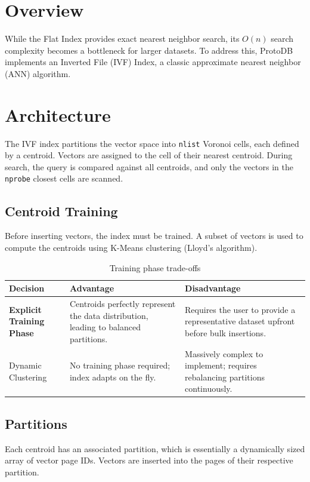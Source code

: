 \documentclass[12pt, a4paper]{report}
\begin{document}
\section{Overview}
While the Flat Index provides exact nearest neighbor search, its $O(n)$ search complexity becomes a bottleneck for larger datasets. To address this, ProtoDB implements an Inverted File (IVF) Index, a classic approximate nearest neighbor (ANN) algorithm.

\section{Architecture}
The IVF index partitions the vector space into \texttt{nlist} Voronoi cells, each defined by a centroid. 
Vectors are assigned to the cell of their nearest centroid. During search, the query is compared against all centroids, and only the vectors in the \texttt{nprobe} closest cells are scanned.

\subsection{Centroid Training}
Before inserting vectors, the index must be trained. A subset of vectors is used to compute the centroids using K-Means clustering (Lloyd's algorithm).

\begin{table}[h]
\centering
\begin{tabularx}{\textwidth}{lXX}
\toprule
\textbf{Decision} & \textbf{Advantage} & \textbf{Disadvantage} \\
\midrule
\textbf{Explicit Training Phase} &
    Centroids perfectly represent the data distribution, leading to balanced partitions. &
    Requires the user to provide a representative dataset upfront before bulk insertions. \\
\addlinespace
Dynamic Clustering &
    No training phase required; index adapts on the fly. &
    Massively complex to implement; requires rebalancing partitions continuously. \\
\bottomrule
\end{tabularx}
\caption{Training phase trade-offs}
\end{table}

\subsection{Partitions}
Each centroid has an associated partition, which is essentially a dynamically sized array of vector page IDs. Vectors are inserted into the pages of their respective partition. 
\end{document}
